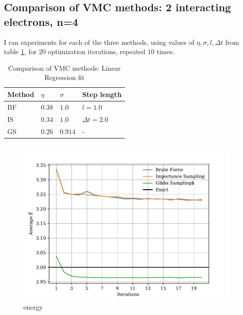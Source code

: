 \documentclass[%
oneside,                 %
final,                   %
10pt]{article}
\begin{document}
\subsection{Comparison of VMC methods: 2 interacting electrons, n=4}
I ran experiments for each of the three methods, using values of $\eta, \sigma, l, \Delta t$ from table \ref{table:sim_set}, for $20$ optimization iterations, repeated $10$ times. 
\begin{table}[h!]
\begin{center}
\begin{tabular}{llll}
\hline
Method & $\eta$ & $\sigma$ & Step length \\
\hline
BF &  $ 0.38 $  & $ 1.0$ & $l=1.0$  \\
IS &  $ 0.34 $  &$1.0 $  & $\Delta t=2.0$\\
GS &  $ 0.26 $ &$0.914 $ & -  \\
\hline
\end{tabular}
\end{center}
\caption{Comparison of VMC methods: Linear Regression fit}
\label{table:sim_set}
\end{table}

\begin{figure}[!h]
        \centering 
         \includegraphics[scale=0.8]{../Results/sim_12/training_interacting.pdf} 
        \caption{energy}
        \label{fig:energy}   
\end{figure}  
\end{document}
